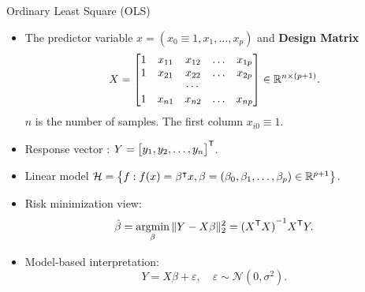 \documentclass[english,handout]{beamer}
\theoremstyle{definition}
\begin{document}




 
\begin{frame}{Ordinary Least Square (OLS)}


  \begin{itemize}

\item 
 The predictor variable 
$x=(x_0\equiv 1, x_1,\ldots,x_p)$ and 
{\bf Design Matrix}
\[
X=\begin{bmatrix}
 1 & x_{11} & x_{12} & \ldots  &x_{1p}  \\
 1 & x_{21} & x_{22} & \ldots &x_{2p}  \\
 &&\cdots& &\\
 1 & x_{n1} & x_{n2} & \ldots &x_{np}  \\
\end{bmatrix}\in {\mathbb{R}}^{n\times (p+1)}.
\]
$n$ is the number of samples.
The first column $x_{i0}\equiv 1$.
\item Response vector :
$Y =\begin{bmatrix}  y_1, y_2, \ldots,y_n\end{bmatrix}^{\textsf{T}}$.
\par 
 
\item   Linear model  $\mathcal{H} = \left\{f: f(x) = \beta^\intercal x, \beta
=(\beta_0,\beta_1,\ldots, \beta_p)\in {\mathbb{R}}^{p+1} \right\}$.

    \item Risk minimization view:
      \[
        \hat{\beta} = \argmin_\beta \|Y - {  X} \beta\|_2^2
        = {({  X}^\tr {  X})}^{-1} {  X}^\tr Y.
      \]

    \item Model-based interpretation:      \[
        Y =  X\beta + \varepsilon, \quad
        \varepsilon \sim \mathcal{N}(0, \sigma^2 ).
      \]
         \end{itemize}
\end{frame}
\end{document}
